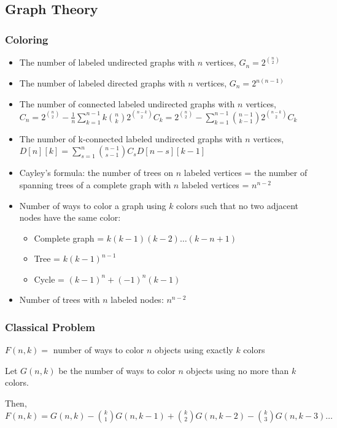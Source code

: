 \subsection{Graph Theory}

\subsubsection{Coloring}
\begin{itemize}
\item The number of labeled undirected graphs with $ n $ vertices, $ G_n = 2^{\binom{n}{2}} $
\item The number of labeled directed graphs with $ n $ vertices, $ G_n = 2^{n(n-1)} $
\item The number of connected labeled undirected graphs with $ n $ vertices, $ C_n = 2^{\binom{n}{2}} - \frac{1}{n} \sum_{k = 1}^{n - 1} k \binom{n}{k} 2^{\binom{n-k}{2}}C_k = 2^{\binom{n}{2}} - \sum_{k = 1}^{n - 1} \binom{n - 1}{k - 1} 2^{\binom{n-k}{2}}C_k $
\item The number of k-connected labeled undirected graphs with $ n $ vertices, $ D[n][k] = \sum_{s = 1}^{n} \binom{n - 1}{s- 1}C_s D[n - s][k - 1] $
\item Cayley's formula: the number of trees on $ n $ labeled vertices = the number of spanning trees of a complete graph with $ n $ labeled vertices = $ n^{n - 2} $
\item Number of ways to color a graph using $ k $ colors such that no two adjacent nodes have the same color:
  \begin{itemize}
    \item Complete graph = $ k(k-1)(k-2)\dots(k-n+1) $
    \item Tree = $ k(k - 1)^{n - 1} $
    \item Cycle = $ (k - 1)^n + (-1)^n (k - 1) $
  \end{itemize}
\item Number of trees with $ n $ labeled nodes: $ n^{n - 2} $
\end{itemize}

\subsubsection{Classical Problem}
$ F(n, k) = $ number of ways to color $n$ objects using exactly $ k $ colors

Let $ G(n, k) $ be the number of ways to color $n$ objects using no more than $ k $ colors.

Then, $ F(n, k) = G(n, k) - \binom{k}{1} G(n, k-1) + \binom{k}{2} G(n, k-2) - \binom{k}{3} G(n, k-3) \dots $

